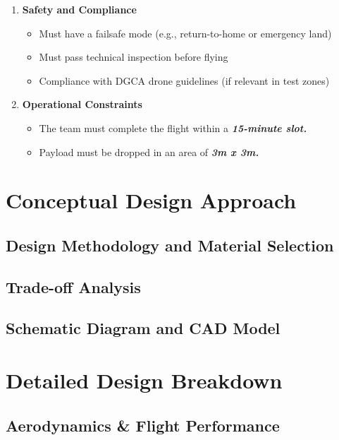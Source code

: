 \documentclass[12pt]{report}
\begin{document}
\begin{enumerate}
\begin{itemize}
        \end{itemize}
      \item \textbf{Safety and Compliance}
        \begin{itemize}
          \item Must have a failsafe mode (e.g., return-to-home or emergency land)
          \item Must pass technical inspection before flying
          \item Compliance with DGCA drone guidelines (if relevant in test zones)
        \end{itemize}
      \item \textbf{Operational Constraints}
        \begin{itemize}
          \item The team must complete the flight within a \textbf{\textit{15-minute slot.}}
          \item Payload must be dropped in an area of \textbf{\textit{3m x 3m.}}
        \end{itemize}
    \end{enumerate}
  \chapter{Conceptual Design Approach}
    \section{Design Methodology and Material Selection}
    
    \section{Trade-off Analysis} %
    \section{Schematic Diagram and CAD Model}
                                                 
  \chapter{Detailed Design Breakdown}                                 
    \section{Aerodynamics \& Flight Performance}
\end{document}
